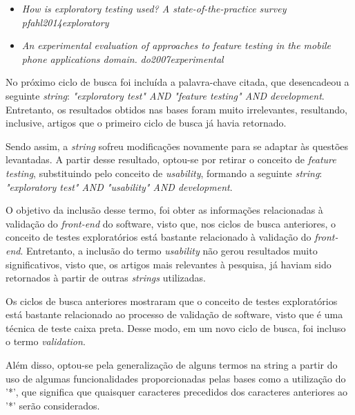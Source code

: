 \begin{itemize}
    \item \textit{How is exploratory testing used? A state-of-the-practice survey} \textit{pfahl2014exploratory}
    \item \textit{An experimental evaluation of approaches to feature testing in the mobile phone applications domain.} \textit{do2007experimental}
    
\end{itemize}

No próximo ciclo de busca foi incluída a palavra-chave citada, que desencadeou a seguinte \textit{string}: \textit{"exploratory test" AND "feature testing" AND development}. Entretanto, os resultados obtidos nas bases foram muito irrelevantes, resultando, inclusive, artigos que o primeiro ciclo de busca já havia retornado. 

Sendo assim, a \textit{string} sofreu modificações novamente para se adaptar às questões levantadas. A partir desse resultado, optou-se por retirar o conceito de \textit{feature testing}, substituindo pelo conceito de \textit{usability}, formando a seguinte \textit{string}: \textit{"exploratory test" AND "usability" AND development}. 

O objetivo da inclusão desse termo, foi obter as informações relacionadas à validação do \textit{front-end} do software, visto que, nos ciclos de busca anteriores, o conceito de testes exploratórios está bastante relacionado à validação do \textit{front-end}. Entretanto, a inclusão do termo \textit{usability} não gerou resultados muito significativos, visto que, os artigos mais relevantes à pesquisa, já haviam sido retornados à partir de outras \textit{strings} utilizadas. 

Os ciclos de busca anteriores mostraram que o conceito de testes exploratórios está bastante relacionado ao processo de validação de software, visto que é uma técnica de teste caixa preta. Desse modo, em um novo ciclo de busca, foi incluso o termo \textit{validation}. 

Além disso, optou-se pela generalização de alguns termos na string a partir do uso de algumas funcionalidades proporcionadas pelas bases como a utilização do ’*’, que significa que quaisquer caracteres precedidos dos caracteres anteriores ao ’*’ serão
considerados. 


